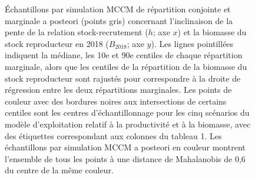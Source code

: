 \documentclass[11pt]{book}
\begin{document}
\begin{figure}[htb]

{\centering {} 

}

\caption{Échantillons par simulation MCCM de répartition conjointe et marginale a posteori (points gris) concernant l’inclinaison de la pente de la relation stock-recrutement ($h$; axe $x$) et la biomasse du stock reproducteur en 2018 ($B_{2018}$; axe $y$). Les lignes pointillées indiquent la médiane, les 10e et 90e centiles de chaque répartition marginale, alors que les centiles de la répartition de la biomasse du stock reproducteur sont rajustés pour correspondre à la droite de régression entre les deux répartitions marginales. Les points de couleur avec des bordures noires aux intersections de certains centiles sont les centres d’échantillonnage pour les cinq scénarios du modèle d’exploitation relatif à la productivité et à la biomasse, avec des étiquettes correspondant aux colonnes du tableau 1. Les échantillons par simulation MCCM a posteori en couleur montrent l’ensemble de tous les points à une distance de Mahalanobis de 0,6 du centre de la même couleur.}\label{fig:unnamed-chunk-17}
\end{figure}
\end{document}
